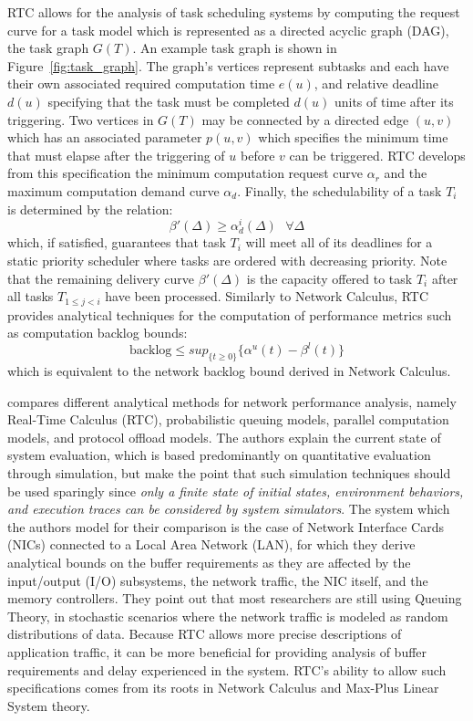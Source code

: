 RTC allows for the analysis of task scheduling systems by computing
the request curve for a task model which is represented as a directed
acyclic graph (DAG), the task graph $G(T)$.  An example task graph is
shown in Figure~\ref{fig:task_graph}.  The graph's vertices represent
subtasks and each have their own associated required computation time
$e(u)$, and relative deadline $d(u)$ specifying that the task must be
completed $d(u)$ units of time after its triggering.  Two vertices in
$G(T)$ may be connected by a directed edge $(u,v)$ which has an
associated parameter $p(u,v)$ which specifies the minimum time that
must elapse after the triggering of $u$ before $v$ can be triggered.
RTC develops from this specification the minimum computation request
curve $\alpha_r$ and the maximum computation demand curve $\alpha_d$.
Finally, the schedulability of a task $T_i$ is determined by the
relation:
\begin{equation}
  \beta'(\Delta)\geq\alpha^i_d(\Delta)\ \ \ \forall\Delta
\end{equation}
which, if satisfied, guarantees that task $T_i$ will meet all of its
deadlines for a static priority scheduler where tasks are ordered with
decreasing priority.  Note that the remaining delivery curve
$\beta'(\Delta)$ is the capacity offered to task $T_i$ after all tasks
$T_{1\leq j<i}$ have been processed. Similarly to Network Calculus,
RTC provides analytical techniques for the computation of performance
metrics such as computation backlog bounds:
\begin{equation}
  \text{backlog}\leq sup_{\{t\geq 0\}}\{\alpha^u(t)-\beta^l(t)\}
\end{equation}
which is equivalent to the network backlog bound derived in Network
Calculus.

\cite{RTCcomparison2011} compares different analytical methods for
network performance analysis, namely Real-Time Calculus (RTC),
probabilistic queuing models, parallel computation models, and
protocol offload models.  The authors explain the current state of
system evaluation, which is based predominantly on quantitative
evaluation through simulation, but make the point that such simulation
techniques should be used sparingly since \textit{only a finite state
of initial states, environment behaviors, and execution traces can
be considered by system simulators}.  The system which the authors
model for their comparison is the case of Network Interface Cards
(NICs) connected to a Local Area Network (LAN), for which they derive
analytical bounds on the buffer requirements as they are affected by
the input/output (I/O) subsystems, the network traffic, the NIC
itself, and the memory controllers.  They point out that most
researchers are still using Queuing Theory, in stochastic scenarios
where the network traffic is modeled as random distributions of data.
Because RTC allows more precise descriptions of application traffic,
it can be more beneficial for providing analysis of buffer
requirements and delay experienced in the system.  RTC's ability to
allow such specifications comes from its roots in Network Calculus and
Max-Plus Linear System theory.

